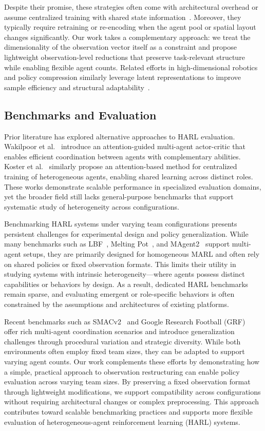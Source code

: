 Despite their promise, these strategies often come with architectural overhead or assume 
centralized training with shared state information~\cite{foerster2017}. Moreover, they typically 
require retraining or re-encoding when the agent pool or spatial layout changes significantly. 
Our work takes a complementary approach: we treat the dimensionality of the observation vector 
itself as a constraint and propose lightweight observation-level reductions that preserve 
task-relevant structure while enabling flexible agent counts. Related efforts in 
high-dimensional robotics and policy compression similarly leverage latent representations 
to improve sample efficiency and structural adaptability~\cite{bitzer2010, tangkaratt2016}.

\subsection{Benchmarks and Evaluation}

Prior literature has explored alternative approaches to HARL evaluation. 
Wakilpoor et al.~\cite{wakilpoor2020} introduce an attention-guided multi-agent actor-critic 
that enables efficient coordination between agents with complementary abilities. 
Koster et al.~\cite{koster2020} similarly propose an attention-based method for centralized 
training of heterogeneous agents, enabling shared learning across distinct roles. 
These works demonstrate scalable performance in specialized evaluation domains, 
yet the broader field still lacks general-purpose benchmarks that support systematic 
study of heterogeneity across configurations.

Benchmarking HARL systems under varying team configurations presents persistent
challenges for experimental design and policy generalization. While many benchmarks 
such as LBF~\cite{papoudakis2021}, Melting Pot~\cite{leibo2021}, and MAgent2~\cite{zheng2017} 
support multi-agent setups, they are primarily designed for homogeneous MARL 
and often rely on shared policies or fixed observation formats. This limits 
their utility in studying systems with intrinsic heterogeneity—where agents possess 
distinct capabilities or behaviors by design. As a result, dedicated HARL benchmarks 
remain sparse, and evaluating emergent or role-specific behaviors is often constrained 
by the assumptions and architectures of existing platforms.

Recent benchmarks such as SMACv2~\cite{ellis2023} and Google Research Football 
(GRF)~\cite{kurach2020} offer rich multi-agent coordination scenarios and introduce 
generalization challenges through procedural variation and strategic diversity. While both 
environments often employ fixed team sizes, they can be adapted to support varying agent counts.
Our work complements these efforts by demonstrating how a simple, practical approach to 
observation restructuring can enable policy evaluation across varying team sizes. By 
preserving a fixed observation format through lightweight modifications, we support compatibility 
across configurations without requiring architectural changes or complex preprocessing.
This approach contributes toward scalable benchmarking practices and supports 
more flexible evaluation of heterogeneous-agent reinforcement learning (HARL) systems.


